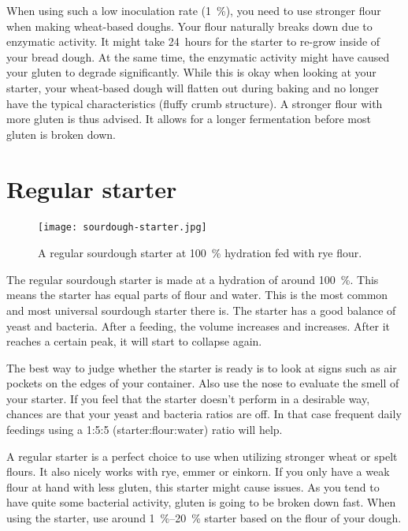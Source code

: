 When using such a low inoculation rate (\qty{1}{\percent}), you need to use stronger
flour when making wheat-based doughs. Your flour naturally breaks down due
to enzymatic activity. It might take 24~hours for the starter to re-grow
inside of your bread dough. At the same time, the enzymatic activity might
have caused your gluten to degrade significantly. While this is okay
when looking at your starter, your wheat-based dough will flatten
out during baking and no longer have the typical characteristics (fluffy crumb
structure). A stronger flour with more gluten is thus advised. It allows for
a longer fermentation before most gluten is broken down.

\section{Regular starter}%
\label{sec:regular-starter}

\begin{figure}[!htb]
  \texttt{[image: sourdough-starter.jpg]}
  \caption[Regular starter]{A regular sourdough starter at \qty{100}{\percent}
      hydration fed with rye flour.}%
  \label{fig:regular-sourdough-starter}
\end{figure}

The regular sourdough starter is made at a hydration of around \qty{100}{\percent}.
This means the starter has equal parts of flour and water. This is the most
common and most universal sourdough starter there is. The starter has a good
balance of yeast and bacteria. After a feeding, the volume increases and
increases. After it reaches a certain peak, it will start to collapse again.

The best way to judge whether the starter is ready is to look at signs such as
air pockets on the edges of your container. Also use the nose to evaluate the
smell of your starter. If you feel that the starter doesn't perform in a
desirable way, chances are that your yeast and bacteria ratios are off. In that
case frequent daily feedings using a 1:5:5 (starter:flour:water) ratio will
help.

A regular starter is a perfect choice to use when utilizing stronger wheat or spelt flours.
It also nicely works with rye, emmer or einkorn. If you only have a weak flour
at hand with less gluten, this starter might cause issues. As you tend to have
quite some bacterial activity, gluten is going to be broken down fast. When
using the starter, use around \qtyrange{1}{20}{\percent} starter based on the flour of your
dough.

